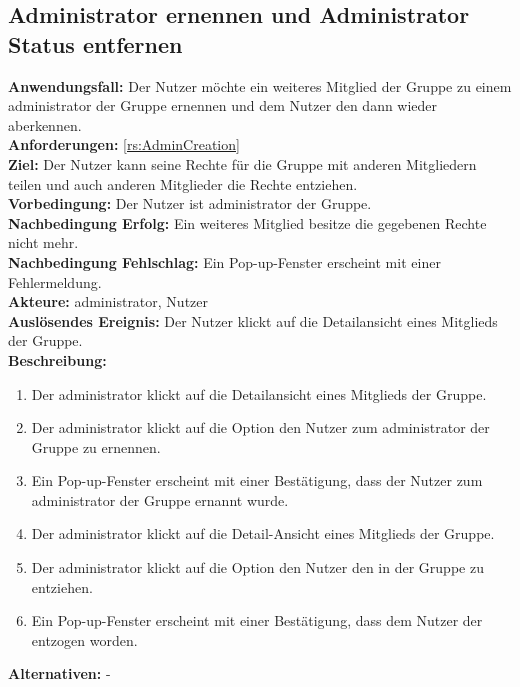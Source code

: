\documentclass[parskip=full]{scrartcl}
\begin{document}
\subsection{Administrator ernennen und Administrator Status entfernen}
\textbf{Anwendungsfall:} Der Nutzer möchte ein weiteres Mitglied der Gruppe zu einem \Gls{administrator} der Gruppe ernennen und dem Nutzer den  dann wieder aberkennen.\\
\textbf{Anforderungen:} \ref{rs:AdminCreation}\\
\textbf{Ziel:} Der Nutzer kann seine Rechte für die Gruppe mit anderen Mitgliedern teilen und auch anderen Mitglieder die Rechte entziehen.\\
\textbf{Vorbedingung:} Der Nutzer ist \Gls{administrator} der Gruppe.\\
\textbf{Nachbedingung Erfolg:} Ein weiteres Mitglied besitze die gegebenen Rechte nicht mehr.\\
\textbf{Nachbedingung Fehlschlag:} Ein Pop-up-Fenster erscheint mit einer Fehlermeldung.\\
\textbf{Akteure:} \Gls{administrator}, Nutzer \\
\textbf{Auslösendes Ereignis:} Der Nutzer klickt auf die Detailansicht eines Mitglieds der Gruppe.\\
\textbf{Beschreibung:}
\begin{enumerate}
    \item Der \Gls{administrator} klickt auf die Detailansicht eines Mitglieds der Gruppe.
    \item Der \Gls{administrator} klickt auf die Option den Nutzer zum \Gls{administrator} der Gruppe zu ernennen.
    \item Ein Pop-up-Fenster erscheint mit einer Bestätigung, dass der Nutzer zum \Gls{administrator} der Gruppe ernannt wurde.
    \item Der \Gls{administrator} klickt auf die Detail-Ansicht eines Mitglieds der Gruppe.
    \item Der \Gls{administrator} klickt auf die Option den Nutzer den  in der Gruppe zu entziehen.
    \item Ein Pop-up-Fenster erscheint mit einer Bestätigung, dass dem Nutzer der  entzogen worden.
\end{enumerate}
\textbf{Alternativen:} -
\newpage
\end{document}

